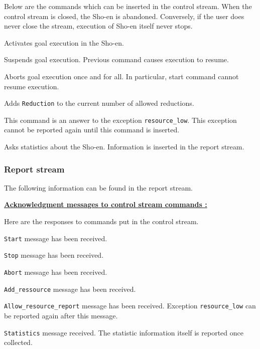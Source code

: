 Below are the commands which can be inserted in the control stream. When the
control stream is closed, the Sho-en is abandoned. Conversely, if the user
does never close the stream, execution of Sho-en itself never stops.
\begin{itemize}

Activates goal execution in the Sho-en.

Suspends goal execution. Previous command causes execution to resume.

Aborts goal execution once and for all. In particular, start command cannot
resume execution.

Adds \verb|Reduction| to the current number of allowed reductions.

This command is an answer to the exception \verb|resource_low|. This
exception cannot be reported again until this command is inserted.

Asks statistics about the Sho-en. Information is inserted in the report
stream.

\end{itemize}
\subsubsection{Report stream}

The following information can be found in the report stream.
\vspace{1ex}

\noindent\underline{\bf Acknowledgment messages to control stream commands :}
\vspace{1ex}\par
Here are the responses to commands put in the control stream.
\begin{itemize}

\verb|Start| message has been received.

\verb|Stop| message has been received.

\verb|Abort| message has been received.

\verb|Add_ressource| message has been received.

\verb|Allow_resource_report| message has been received.
Exception \verb|resource_low| can be reported again after this message.

\verb|Statistics| message received. The statistic information itself is
reported once collected.

\end{itemize}
\vspace{1ex}

